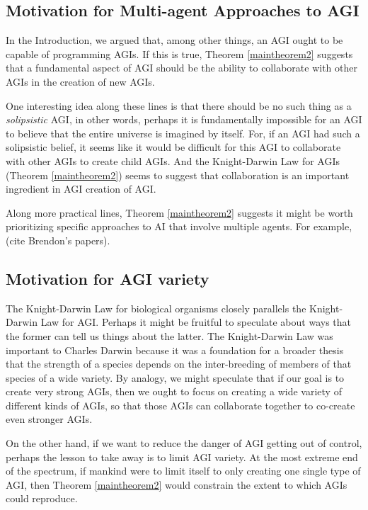 \documentclass[runningheads]{llncs}
\begin{document}
\subsection{Motivation for Multi-agent Approaches to AGI}

In the Introduction, we argued that, among other things, an AGI ought to be
capable of programming AGIs. If this is true, Theorem \ref{maintheorem2} suggests
that a fundamental aspect of AGI should be the ability to collaborate with other
AGIs in the creation of new AGIs.

One interesting idea along these lines is that there should be no
such thing as a \emph{solipsistic} AGI, in other words, perhaps it is
fundamentally impossible for an AGI to believe that the entire universe
is imagined by itself. For, if an AGI had such a solipsistic belief, it
seems like it would be difficult for this AGI to collaborate with other AGIs
to create child AGIs. And the Knight-Darwin Law for AGIs (Theorem \ref{maintheorem2})
seems to suggest that collaboration is an important ingredient in AGI creation of AGI.

Along more practical lines, Theorem \ref{maintheorem2} suggests it might be worth
prioritizing specific approaches to AI that involve multiple agents. For example,
(cite Brendon's papers).

\subsection{Motivation for AGI variety}

The Knight-Darwin Law for biological organisms closely parallels the Knight-Darwin
Law for AGI. Perhaps it might be fruitful to speculate about ways that the former
can tell us things about the latter. The Knight-Darwin Law was important to Charles
Darwin because it was a foundation for a broader thesis that the strength of a
species depends on the inter-breeding of members of that species of a wide variety.
By analogy, we might speculate that if our goal is to create very strong AGIs, then
we ought to focus on creating a wide variety of different kinds of AGIs, so that
those AGIs can collaborate together to co-create even stronger AGIs.

On the other hand, if we want to reduce the danger of AGI getting out of control,
perhaps the lesson to take away is to limit AGI variety. At the most extreme end
of the spectrum, if mankind were to limit itself to only creating one single
type of AGI, then Theorem \ref{maintheorem2} would constrain the extent to which
AGIs could reproduce.
\end{document}
